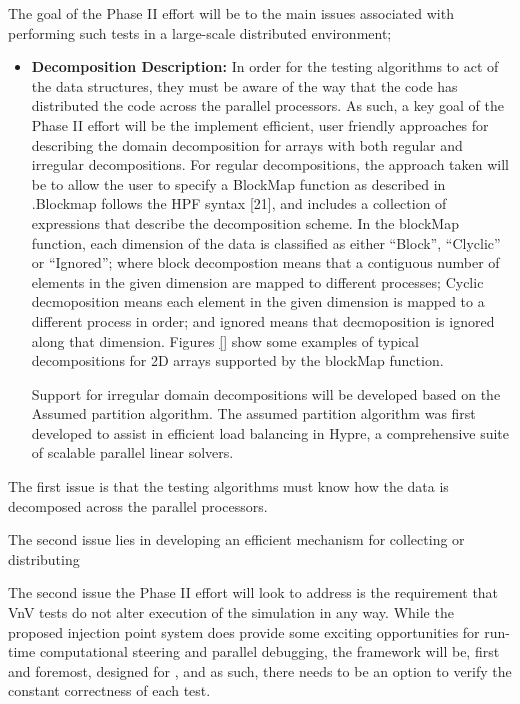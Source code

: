 The goal of the Phase II effort will be to the main issues associated with performing such tests in a large-scale distributed environment;
\begin{itemize}
 \item {\bf Decomposition Description:} In order for the testing algorithms to act of the data structures, they must be aware of the way that the code has distributed 
 the code across the parallel processors. As such, a key goal of the Phase II effort will be the implement efficient, user friendly approaches for describing the domain 
 decomposition for arrays with both regular and irregular decompositions. For regular decompositions, the approach taken will be to allow the user to specify a BlockMap function as described in \cite{}.Blockmap follows the HPF syntax [21], and includes a collection of expressions that describe the decomposition scheme. In the blockMap function, each dimension of the data is classified as either ``Block'', ``Clyclic'' or ``Ignored''; where block decompostion means that a contiguous number of elements in the given dimension are mapped to different processes; Cyclic decmoposition means each element in the given dimension is mapped to a different process in order; and ignored means that decmoposition is ignored along that dimension. Figures \ref{} show some examples of typical decompositions for 2D arrays supported by the blockMap function.
 
 Support for irregular domain decompositions will be developed based on the Assumed partition algorithm. The assumed partition algorithm was first developed to assist in efficient load balancing in Hypre, a comprehensive suite of scalable parallel linear solvers. 
 
 
 
 
\end{itemize}


The first issue is that the testing algorithms must know how the data is decomposed across the parallel processors.



The second issue lies in developing an efficient mechanism for collecting or distributing 






The second issue the Phase II effort will look to address is the requirement that VnV tests do not alter execution of the simulation in any way. While the proposed injection point system does provide some exciting opportunities for run-time computational steering and parallel debugging, the framework will be, first and foremost, designed for \VV, and as such, there needs to be an option to verify the constant correctness of each test.





